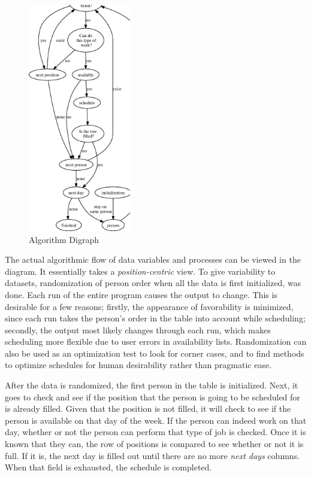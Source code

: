 \documentclass[a4paper,11pt]{article}
\begin{document}
\begin{figure}
    \includegraphics[height=10cm]{graph.eps}
    \caption{\small Algorithm Digraph}
\end{figure}

The actual algorithmic flow of data variables and processes can be viewed in the diagram. It essentially takes a \textit{position-centric} view. To give variability to datasets, randomization of person order when all the data is first initialized, was done. Each run of the entire program causes the output to change. This is desirable for a few reasons; firstly, the appearance of favorability is minimized, since each run takes the person's order in the table into account while scheduling; secondly, the output most likely changes through each run, which makes scheduling more flexible due to user errors in availability lists. Randomization can also be used as an optimization test to look for corner cases, and to find methods to optimize schedules for human desirability rather than pragmatic ease. 

After the data is randomized, the first person in the table is initialized. Next, it goes to check and see if the position that the person is going to be scheduled for is already filled. Given that the position is not filled, it will check to see if the person is available on that day of the week. If the person can indeed work on that day, whether or not the person can perform that type of job is checked. Once it is known that they can, the row of positions is compared to see whether or not it is full. If it is, the next day is filled out until there are no more \textit{next days} columns. When that field is exhausted, the schedule is completed. 
\end{document}
